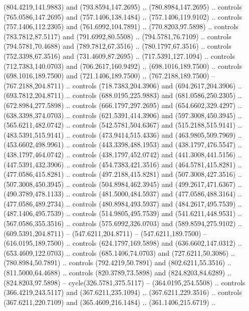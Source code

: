 {{\begin{scope}[y=-0.80pt,x=0.80pt,scale=0.038,xshift=-420pt,yshift=215pt]
        (804.4219,141.9883) and (793.8594,147.2695) .. (780.8984,147.2695) .. controls
        (765.0586,147.2695) and (757.1406,138.1484) .. (757.1406,119.9102) .. controls
        (757.1406,112.2305) and (761.6992,104.7891) .. (770.8203,97.5898) .. controls
        (783.7812,87.5117) and (791.6992,80.5508) .. (794.5781,76.7109) .. controls
        (794.5781,70.4688) and (789.7812,67.3516) .. (780.1797,67.3516) .. controls
        (752.3398,67.3516) and (731.4609,87.2695) .. (717.5391,127.1094) .. controls
        (712.7383,140.0703) and (706.2617,160.9492) .. (698.1016,189.7500) .. controls
        (698.1016,189.7500) and (721.1406,189.7500) .. (767.2188,189.7500) --
        (767.2188,204.8711) .. controls (718.7383,204.3906) and (694.2617,204.3906) ..
        (693.7812,204.8711) .. controls (688.0195,225.9883) and (681.0586,250.2305) ..
        (672.8984,277.5898) .. controls (666.1797,297.2695) and (654.6602,329.4297) ..
        (638.3398,374.0703) .. controls (621.5391,414.3906) and (597.3008,450.3945) ..
        (565.6211,482.0742) .. controls (542.5781,504.6367) and (515.2188,515.9141) ..
        (483.5391,515.9141) .. controls (473.9414,515.4336) and (463.9805,509.7969) ..
        (453.6602,498.9961) .. controls (443.3398,488.1953) and (438.1797,476.5547) ..
        (438.1797,464.0742) .. controls (438.1797,452.0742) and (441.3008,441.5156) ..
        (447.5391,432.3906) .. controls (454.7383,421.3516) and (464.5781,415.8281) ..
        (477.0586,415.8281) .. controls (497.2188,415.8281) and (507.3008,427.3516) ..
        (507.3008,450.3945) .. controls (504.8984,462.3945) and (499.2617,471.6367) ..
        (490.3789,478.1133) .. controls (481.5000,484.5937) and (477.0586,488.3164) ..
        (477.0586,489.2734) .. controls (480.8984,493.5937) and (484.2617,495.7539) ..
        (487.1406,495.7539) .. controls (514.9805,495.7539) and (541.6211,448.9531) ..
        (567.0586,355.3516) .. controls (575.6992,326.0703) and (589.8594,275.9102) ..
        (609.5391,204.8711) -- (547.6211,204.8711) -- (547.6211,189.7500) --
        (616.0195,189.7500) .. controls (624.1797,169.5898) and (636.6602,147.0312) ..
        (653.4609,122.0703) .. controls (685.1406,74.0703) and (727.6211,50.3086) ..
        (780.8984,50.7891) .. controls (792.4219,50.7891) and (802.6211,55.3516) ..
        (811.5000,64.4688) .. controls (820.3789,73.5898) and (824.8203,84.6289) ..
        (824.8203,97.5898) -- cycle(326.5781,375.5117) -- (364.0195,254.5508) ..
        controls (366.4219,243.5117) and (367.6211,235.1094) .. (367.6211,229.3516) ..
        controls (367.6211,220.7109) and (365.4609,216.1484) .. (361.1406,215.6719) ..

\end{scope}}}
